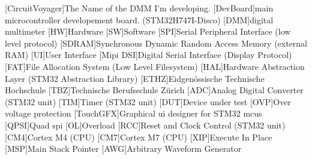 \begin{acronym}
        [CircuitVoyager]{The Name of the DMM I'm developing.}
        [DevBoard]{main microcontroller developement board. (STM32H747I-Disco)}
        [DMM]{digital multimeter}
        [HW]{Hardware}
        [SW]{Software}
        [SPI]{Serial Peripheral Interface (low level protocol)}
        [SDRAM]{Synchronous Dynamic Random Access Memory (external RAM)}
        [UI]{User Interface}
        [Mipi DSI]{Digital Serial Interface (Display Protocol)}
        [FAT]{File Allocation System (Low Level Filesystem)}
        [HAL]{Hardware Abstraction Layer (STM32 Abstraction Library)}
        [ETHZ]{Eidgenössische Technische Hochschule}
        [TBZ]{Technische Berufsschule Zürich}
        [ADC]{Analog Digital Converter (STM32 unit)}
        [TIM]{Timer (STM32 unit)}
        [DUT]{Device under test}
        [OVP]{Over voltage protection}
        [TouchGFX]{Graphical \acs{ui} designer for STM32 \acs{mcu}s}
        [QPSI]{Quad \acs{spi}}
        [OL]{Overload}
        [RCC]{Reset and Clock Control (STM32 unit)}
        [CM4]{Cortex M4 (CPU)}
        [CM7]{Cortex M7 (CPU)}
        [XIP]{Execute In Place}
        [MSP]{Main Stack Pointer}
        [AWG]{Arbitrary Waveform Generator}
\end{acronym}